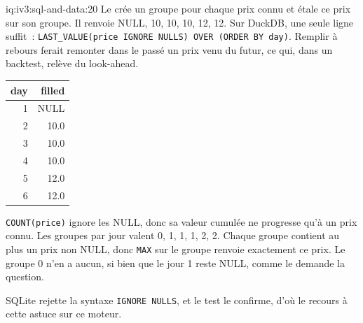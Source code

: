 \begin{solution}{iq:iv3:sql-and-data:20}
Le  crée un groupe pour chaque prix connu et étale ce prix sur son groupe. Il renvoie NULL, 10, 10, 10, 12, 12. Sur DuckDB, une seule ligne suffit~: \texttt{LAST\_VALUE(price IGNORE NULLS) OVER (ORDER BY day)}. Remplir à rebours ferait remonter dans le passé un prix venu du futur, ce qui, dans un backtest, relève du look-ahead.
\label{lst:iv3:sq:ffill}
\begin{center}\small
\begin{tabular}{rr}
day & filled\\\hline
1 & NULL\\
2 & 10.0\\
3 & 10.0\\
4 & 10.0\\
5 & 12.0\\
6 & 12.0
\end{tabular}
\end{center}
\texttt{COUNT(price)} ignore les NULL, donc sa valeur cumulée ne progresse qu'à un prix connu. Les groupes par jour valent 0, 1, 1, 1, 2, 2. Chaque groupe contient au plus un prix non NULL, donc \texttt{MAX} sur le groupe renvoie exactement ce prix. Le groupe 0 n'en a aucun, si bien que le jour 1 reste NULL, comme le demande la question.

SQLite rejette la syntaxe \texttt{IGNORE NULLS}, et le test le confirme, d'où le recours à cette astuce sur ce moteur.

\end{solution}

